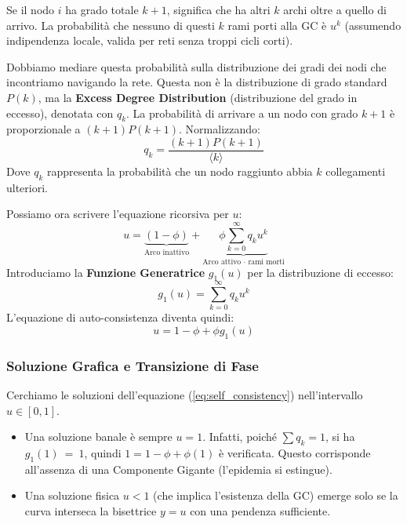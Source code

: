 \noindent Se il nodo $i$ ha grado totale $k+1$, significa che ha altri $k$ archi oltre a quello di arrivo. La probabilità che nessuno di questi $k$ rami porti alla GC è $u^k$ (assumendo indipendenza locale, valida per reti senza troppi cicli corti).

Dobbiamo mediare questa probabilità sulla distribuzione dei gradi dei nodi che incontriamo navigando la rete. Questa non è la distribuzione di grado standard $P(k)$, ma la \textbf{Excess Degree Distribution} (distribuzione del grado in eccesso), denotata con $q_k$.
La probabilità di arrivare a un nodo con grado $k+1$ è proporzionale a $(k+1)P(k+1)$. Normalizzando:
\begin{equation}
    q_k = \frac{(k+1)P(k+1)}{\langle k \rangle}
\end{equation}
Dove $q_k$ rappresenta la probabilità che un nodo raggiunto abbia $k$ collegamenti ulteriori.

Possiamo ora scrivere l'equazione ricorsiva per $u$:
\begin{equation}
    u = \underbrace{(1 - \phi)}_{\text{Arco inattivo}} + \underbrace{\phi \sum_{k=0}^{\infty} q_k u^k}_{\text{Arco attivo } \cdot \text{ rami morti}}
\end{equation}
Introduciamo la \textbf{Funzione Generatrice} $g_1(u)$ per la distribuzione di eccesso:
\begin{equation}
    g_1(u) = \sum_{k=0}^{\infty} q_k u^k
\end{equation}
L'equazione di auto-consistenza diventa quindi:
\begin{equation} \label{eq:self_consistency}
    u = 1 - \phi + \phi g_1(u)
\end{equation}

\subsubsection{Soluzione Grafica e Transizione di Fase}

Cerchiamo le soluzioni dell'equazione (\ref{eq:self_consistency}) nell'intervallo $u \in [0, 1]$.




\begin{itemize}
    \item Una soluzione banale è sempre $u=1$. Infatti, poiché $\sum q_k = 1$, si ha $g_1(1)~=~1$, quindi $1 = 1 - \phi + \phi(1)$ è verificata. Questo corrisponde all'assenza di una Componente Gigante (l'epidemia si estingue).
    \item Una soluzione fisica $u < 1$ (che implica l'esistenza della GC) emerge solo se la curva interseca la bisettrice $y=u$ con una pendenza sufficiente.
\end{itemize}


